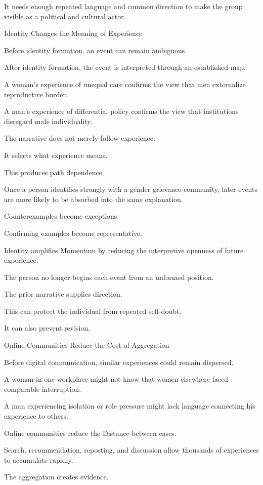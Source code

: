 It needs enough repeated language and common direction to make the group visible as a political and cultural actor.

Identity Changes the Meaning of Experience

Before identity formation, an event can remain ambiguous.

After identity formation, the event is interpreted through an established map.

A woman’s experience of unequal care confirms the view that men externalize reproductive burden.

A man’s experience of differential policy confirms the view that institutions disregard male individuality.

The narrative does not merely follow experience.

It selects what experience means.

This produces path dependence.

Once a person identifies strongly with a gender grievance community, later events are more likely to be absorbed into the same explanation.

Counterexamples become exceptions.

Confirming examples become representative.

Identity amplifies Momentum by reducing the interpretive openness of future experience.

The person no longer begins each event from an unformed position.

The prior narrative supplies direction.

This can protect the individual from repeated self-doubt.

It can also prevent revision.

Online Communities Reduce the Cost of Aggregation

Before digital communication, similar experiences could remain dispersed.

A woman in one workplace might not know that women elsewhere faced comparable interruption.

A man experiencing isolation or role pressure might lack language connecting his experience to others.

Online communities reduce the Distance between cases.

Search, recommendation, reposting, and discussion allow thousands of experiences to accumulate rapidly.

The aggregation creates evidence.

